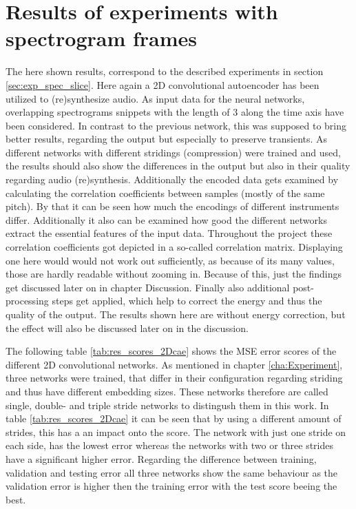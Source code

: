 \section{Results of experiments with spectrogram frames}
The here shown results, correspond to the described experiments in section \ref{sec:exp_spec_slice}. Here again a 2D convolutional autoencoder has been utilized to (re)synthesize audio. As input data for the neural networks, overlapping spectrograms snippets with the length of 3 along the time axis have been considered. In contrast to the previous network, this was supposed to bring better results, regarding the output but especially to preserve transients. As different networks with different stridings (compression) were trained and used, the results should also show the differences in the output but also in their quality regarding audio (re)synthesis. Additionally the encoded data gets examined by calculating the correlation coefficients between samples (mostly of the same pitch). By that it can be seen how much the encodings of different instruments differ. Additionally it also can be examined how good the different networks extract the essential features of the input data. Throughout the project these correlation coefficients got depicted in a so-called correlation matrix. Displaying one here would would not work out sufficiently, as because of its many values, those are hardly readable without zooming in. Because of this, just the findings get discussed later on in chapter Discussion. Finally also additional post-processing steps get applied, which help to correct the energy and thus the quality of the output. The results shown here are without energy correction, but the effect will also be discussed later on in the discussion.

The following table \ref{tab:res_scores_2Dcae} shows the MSE error scores of the different 2D convolutional networks. As mentioned in chapter \ref{cha:Experiment}, three networks were trained, that differ in their configuration regarding striding and thus have different embedding sizes. These networks therefore are called single, double- and triple stride networks to distingush them in this work. In table \ref{tab:res_scores_2Dcae} it can be seen that by using a different amount of strides, this has a an impact onto the score. The network with just one stride on each side, has the lowest error whereas the networks with two or three strides have a significant higher error. Regarding the difference between training, validation and testing error all three networks show the same behaviour as the validation error is higher then the training error with the test score beeing the best. 

